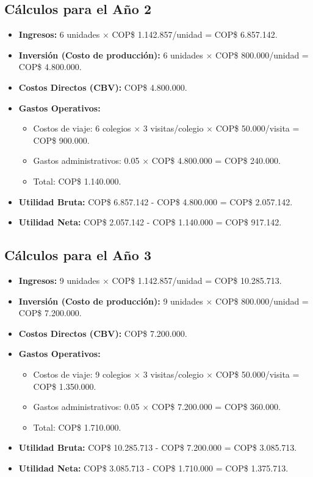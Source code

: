 \subsection{Cálculos para el Año 2}
\begin{itemize}
  \item \textbf{Ingresos:} 6 unidades $\times$ COP\$ 1.142.857/unidad =
    COP\$ 6.857.142.
  \item \textbf{Inversión (Costo de producción):}
    6 unidades $\times$ COP\$ 800.000/unidad = COP\$ 4.800.000.
  \item \textbf{Costos Directos (CBV):} COP\$ 4.800.000.
  \item \textbf{Gastos Operativos:}
    \begin{itemize}
      \item Costos de viaje: 6 colegios $\times$ 3 visitas/colegio $\times$
        COP\$ 50.000/visita = COP\$ 900.000.
      \item Gastos administrativos:
        0.05 $\times$ COP\$ 4.800.000 = COP\$ 240.000.
      \item Total: COP\$ 1.140.000.
    \end{itemize}
  \item \textbf{Utilidad Bruta:} COP\$ 6.857.142 - COP\$ 4.800.000 = COP\$ 2.057.142.
  \item \textbf{Utilidad Neta:} COP\$ 2.057.142 - COP\$ 1.140.000 = COP\$ 917.142.
\end{itemize}

\subsection{Cálculos para el Año 3}
\begin{itemize}
  \item \textbf{Ingresos:} 9 unidades $\times$ COP\$ 1.142.857/unidad =
    COP\$ 10.285.713.
  \item \textbf{Inversión (Costo de producción):}
    9 unidades $\times$ COP\$ 800.000/unidad = COP\$ 7.200.000.
  \item \textbf{Costos Directos (CBV):} COP\$ 7.200.000.
  \item \textbf{Gastos Operativos:}
    \begin{itemize}
      \item Costos de viaje:
        9 colegios $\times$ 3 visitas/colegio $\times$ COP\$ 50.000/visita =
        COP\$ 1.350.000.
      \item Gastos administrativos: 0.05 $\times$ COP\$ 7.200.000 =
        COP\$ 360.000.
      \item Total: COP\$ 1.710.000.
    \end{itemize}
  \item \textbf{Utilidad Bruta:} COP\$ 10.285.713 - COP\$ 7.200.000 = COP\$ 3.085.713.
  \item \textbf{Utilidad Neta:} COP\$ 3.085.713 - COP\$ 1.710.000 = COP\$ 1.375.713.
\end{itemize}

